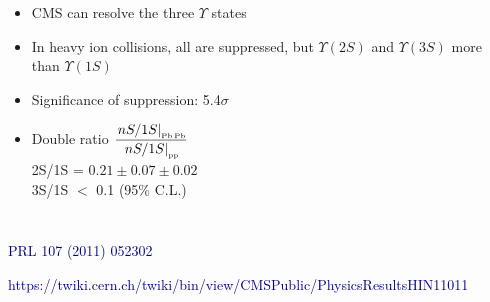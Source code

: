 \documentclass[compress]{beamer}
\begin{document}
\begin{frame}
\begin{columns}

\vspace{-0.5 cm}
\begin{itemize}
\item CMS can resolve the three $\Upsilon$ states
\item<2-> In heavy ion collisions, all are suppressed, but $\Upsilon(2S)$ and $\Upsilon(3S)$ more than $\Upsilon(1S)$
\item<3-> Significance of suppression: 5.4$\sigma$
\item<3-> Double ratio \scriptsize \mbox{$\displaystyle \frac{\left.nS/1S\right|_{\mbox{\tiny Pb$\,$Pb}}}{\left.nS/1S\right|_{\mbox{\tiny pp}}}$\hspace{-0.5 cm}} \\

2S/1S = $0.21 \pm 0.07 \pm 0.02$ \\
3S/1S $<$ 0.1 (95\% C.L.)
\end{itemize}
\end{columns}

\scriptsize
\hfill \textcolor{darkblue}{PRL 107 (2011) 052302}

\hfill \textcolor{darkblue}{https://twiki.cern.ch/twiki/bin/view/CMSPublic/PhysicsResultsHIN11011}
\end{frame}
\end{document}
